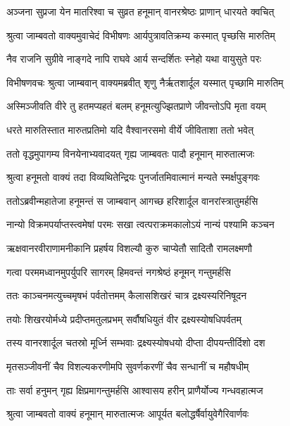 \twolineshloka
{अञ्जना सुप्रजा येन मातरिश्वा च सुव्रत}
{हनूमान् वानरश्रेष्ठः प्राणान् धारयते क्वचित्} %

\twolineshloka
{श्रुत्वा जाम्बवतो वाक्यमुवाचेदं विभीषणः}
{आर्यपुत्रावतिक्रम्य कस्मात् पृच्छसि मारुतिम्} %

\twolineshloka
{नैव राजनि सुग्रीवे नाङ्गदे नापि राघवे}
{आर्य सन्दर्शितः स्नेहो यथा वायुसुते परः} %

\twolineshloka
{विभीषणवचः श्रुत्वा जाम्बवान् वाक्यमब्रवीत्}
{शृणु नैर्ऋतशार्दूल यस्मात् पृच्छामि मारुतिम्} %

\twolineshloka
{अस्मिञ्जीवति वीरे तु हतमप्यहतं बलम्}
{हनूमत्युज्झितप्राणे जीवन्तोऽपि मृता वयम्} %

\twolineshloka
{धरते मारुतिस्तात मारुतप्रतिमो यदि}
{वैश्वानरसमो वीर्ये जीविताशा ततो भवेत्} %

\twolineshloka
{ततो वृद्धमुपागम्य विनयेनाभ्यवादयत्}
{गृह्य जाम्बवतः पादौ हनूमान् मारुतात्मजः} %

\twolineshloka
{श्रुत्वा हनूमतो वाक्यं तदा विव्यथितेन्द्रियः}
{पुनर्जातमिवात्मानं मन्यते स्मर्क्षपुङ्गवः} %

\twolineshloka
{ततोऽब्रवीन्महातेजा हनूमन्तं स जाम्बवान्}
{आगच्छ हरिशार्दूल वानरांस्त्रातुमर्हसि} %

\twolineshloka
{नान्यो विक्रमपर्याप्तस्त्वमेषां परमः सखा}
{त्वत्पराक्रमकालोऽयं नान्यं पश्यामि कञ्चन} %

\twolineshloka
{ऋक्षवानरवीराणामनीकानि प्रहर्षय}
{विशल्यौ कुरु चाप्येतौ सादितौ रामलक्ष्मणौ} %

\twolineshloka
{गत्वा परममध्वानमुपर्युपरि सागरम्}
{हिमवन्तं नगश्रेष्ठं हनूमन् गन्तुमर्हसि} %

\twolineshloka
{ततः काञ्चनमत्युच्चमृषभं पर्वतोत्तमम्}
{कैलासशिखरं चात्र द्रक्ष्यस्यरिनिषूदन} %

\twolineshloka
{तयोः शिखरयोर्मध्ये प्रदीप्तमतुलप्रभम्}
{सर्वौषधियुतं वीर द्रक्ष्यस्योषधिपर्वतम्} %

\twolineshloka
{तस्य वानरशार्दूल चतस्रो मूर्ध्नि सम्भवाः}
{द्रक्ष्यस्योषधयो दीप्ता दीपयन्तीर्दिशो दश} %

\twolineshloka
{मृतसञ्जीवनीं चैव विशल्यकरणीमपि}
{सुवर्णकरणीं चैव सन्धानीं च महौषधीम्} %

\twolineshloka
{ताः सर्वा हनुमन् गृह्य क्षिप्रमागन्तुमर्हसि}
{आश्वासय हरीन् प्राणैर्योज्य गन्धवहात्मज} %

\twolineshloka
{श्रुत्वा जाम्बवतो वाक्यं हनूमान् मारुतात्मजः}
{आपूर्यत बलोद्धर्षैर्वायुवेगैरिवार्णवः} %

